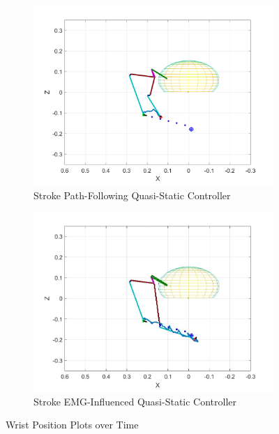 \begin{figure}[ht]
    \vspace{2pt} %

    \begin{subfigure}[b]{0.5\textwidth}
        \centering

        \includegraphics[width=0.75\linewidth]{Pictures/Results/Controller/StrokeWithouControl_WP.png}
        \caption{Stroke Path-Following Quasi-Static Controller}
    \end{subfigure}%
    \hfill
    \begin{subfigure}[b]{0.5\textwidth}
        \centering

        \includegraphics[width=0.75\linewidth]{Pictures/Results/Controller/G(2.99)_G(14.48)_Stroke_7_position_totry(5485)_wp.jpg}
        \caption{Stroke EMG-Influenced Quasi-Static Controller}
    \end{subfigure}

    \caption{Wrist Position Plots over Time}
    \label{fig:allcontrollers}
\end{figure}

